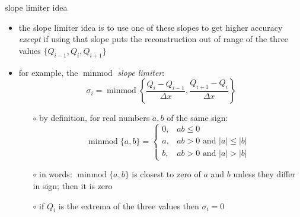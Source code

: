 \documentclass[10pt,dvipsnames,usepdftitle=false,
hyperref={pdftitle = {Finite volume methods},
    pdfauthor = {Ed Bueler}}]{beamer}
\newcommand{\minmod}{\operatorname{minmod}}
\begin{document}
\begin{frame}{slope limiter idea}

\begin{itemize}
\item the slope limiter idea is to use one of these slopes to get higher accuracy \emph{except} if using that slope puts the reconstruction out of range of the three values $\{Q_{i-1},Q_i,Q_{i+1}\}$
\item for example, the \alert{$\minmod$ \emph{slope limiter}:}
    $$\sigma_i = \minmod\left\{\frac{Q_i-Q_{i-1}}{\Delta x},\frac{Q_{i+1}-Q_i}{\Delta x}\right\}$$

    \begin{itemize}
    \item[$\circ$] by definition, for real numbers $a,b$ of the same sign:
        $$\minmod\{a,b\} = \begin{cases} 0, & ab \le 0 \\
                                         a, & ab>0 \text{ and } |a| \le |b| \\
                                         b, & ab>0 \text{ and } |a| > |b| \end{cases}$$
    \item[$\circ$] in words: $\minmod\{a,b\}$ is closest to zero of $a$ and $b$ unless they differ in sign; then it is zero
    \item[$\circ$] if $Q_i$ is the extrema of the three values then $\sigma_i = 0$
    \end{itemize}
\end{itemize}
\end{frame}
\end{document}
